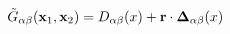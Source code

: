 \begin{equation}                      
\tilde{G}_{\alpha \beta}({\bf x}_{1}, {\bf x}_{2}) =                      
D_{\alpha \beta}(x) + {\bf r} \cdot {\bf \Delta}_{\alpha \beta}(x)                      
\label{eq:qam}                      
\end{equation} 
